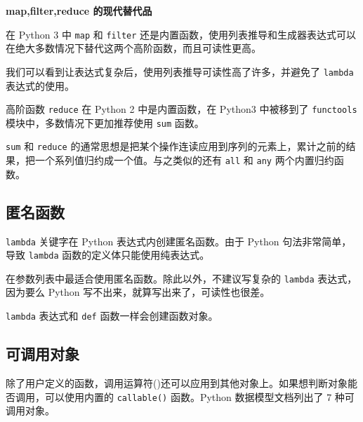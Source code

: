 \noindent\textbf{map,filter,reduce 的现代替代品}

在 Python 3 中 \texttt{map} 和 \texttt{filter} 还是内置函数，使用列表推导和生成器表达式可以在绝大多数情况下替代这两个高阶函数，而且可读性更高。



我们可以看到让表达式复杂后，使用列表推导可读性高了许多，并避免了 \texttt{lambda} 表达式的使用。

高阶函数 \texttt{reduce} 在 Python 2 中是内置函数，在 Python3 中被移到了 \texttt{functools} 模块中，多数情况下更加推荐使用 \texttt{sum} 函数。



\texttt{sum} 和 \texttt{reduce} 的通常思想是把某个操作连读应用到序列的元素上，累计之前的结果，把一个系列值归约成一个值。与之类似的还有 \texttt{all} 和 \texttt{any} 两个内置归约函数。 

\subsection{匿名函数}

\texttt{lambda} 关键字在 Python 表达式内创建匿名函数。由于 Python 句法非常简单，导致 \texttt{lambda} 函数的定义体只能使用纯表达式。

在参数列表中最适合使用匿名函数。除此以外，不建议写复杂的 \texttt{lambda} 表达式，因为要么 Python 写不出来，就算写出来了，可读性也很差。



\texttt{lambda} 表达式和 \texttt{def} 函数一样会创建函数对象。

\subsection{可调用对象}

除了用户定义的函数，调用运算符()还可以应用到其他对象上。如果想判断对象能否调用，可以使用内置的 \texttt{callable()} 函数。Python 数据模型文档列出了 7 种可调用对象。

